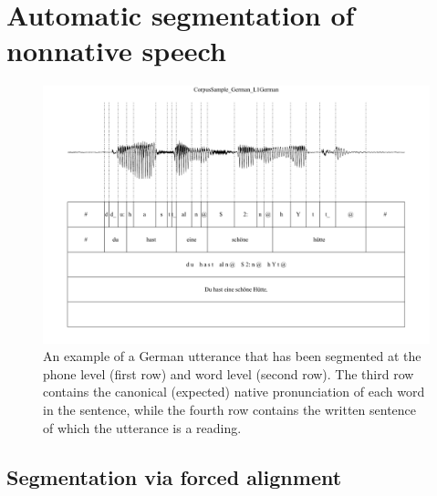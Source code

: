 \section{Automatic segmentation of nonnative speech}
\label{sec:diag:segmentation}


	
	
	
	\begin{figure}
		\centering
		\includegraphics[width=\textwidth]{img/screenshots/SampleGG-basic}
		\caption{An example of a German utterance that has been segmented at the phone level (first row) and word level (second row). The third row contains the canonical (expected) native pronunciation of each word in the sentence, while the fourth row contains the written sentence of which the utterance is a reading.}
		\label{fig:GGsegmentation}
	\end{figure}

	\subsection{Segmentation via forced alignment}
	\label{sec:segmentation:alignment}
	

